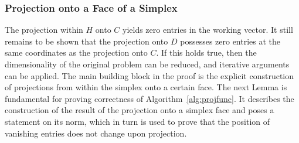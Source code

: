 \documentclass[twoside,11pt]{article}
\newcommand{\0}{\mathcal{O}}
\begin{document}
\subsubsection{Projection onto a Face of a Simplex}
The projection within $H$ onto $C$ yields zero entries in the working vector.
It still remains to be shown that the projection onto $D$ possesses zero entries at the same coordinates as the projection onto $C$.
If this holds true, then the dimensionality of the original problem can be reduced, and iterative arguments can be applied.
The main building block in the proof is the explicit construction of projections from within the simplex onto a certain face.
The next Lemma is fundamental for proving correctness of Algorithm~\ref{alg:projfunc}.
It describes the construction of the result of the projection onto a simplex face and poses a statement on its norm, which in turn is used to prove that the position of vanishing entries does not change upon projection.
\end{document}
